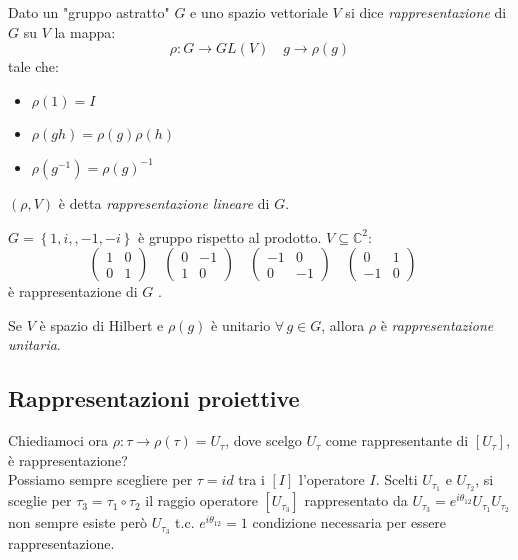 \begin{definition}
    Dato un "gruppo astratto" \(G\) e uno spazio vettoriale \(V\) si dice \textit{rappresentazione} di \(G\) su \(V\) la mappa:
    \begin{equation}
        \rho: G \to GL(V) \quad g \to \rho(g)
    \end{equation}
    tale che:
    \begin{itemize}
        \item \(\rho(1)= I\)
        \item \(\rho(gh)= \rho(g)\rho(h)\)
        \item \(\rho(g^{-1}) = \rho(g)^{-1}\)
    \end{itemize}
    \((\rho, V)\) è detta \textit{rappresentazione lineare } di \(G\).
\end{definition}

\begin{example}
    \(G= \left\{ 1,i,,-1,-i \right\}\) è gruppo rispetto al prodotto. \(V \subseteq \mathbb{C}^2: \)
    \[
        \begin{pmatrix}
            1&0\\0&1
        \end{pmatrix} \quad
        \begin{pmatrix}
            0&-1\\1&0
        \end{pmatrix} \quad
        \begin{pmatrix}
            -1&0\\0&-1
        \end{pmatrix} \quad
        \begin{pmatrix}
            0&1\\-1&0
        \end{pmatrix} \quad
    \]
    è rappresentazione di \(G\) .
\end{example}



Se \(V\) è spazio di Hilbert e \(\rho(g)\) è unitario \(\forall \, g \in G\), allora \(\rho\) è \textit{rappresentazione unitaria}.

\subsection{Rappresentazioni proiettive}

Chiediamoci ora \(\rho: \tau\to \rho(\tau)= U_\tau\), dove scelgo \(U_\tau \) come rappresentante di \(\left[ U_\tau \right]\), è rappresentazione?\\
Possiamo sempre scegliere per \(\tau = id\) tra i \(\left[ I \right] \) l'operatore \(I\). Scelti \(U_{\tau_1}\) e \(U_{\tau_2}\),
si sceglie per \(\tau_3 =\tau_1 \circ \tau_2 \) il raggio operatore \(\left[ U_{\tau_3} \right]\) rappresentato da \(U_{\tau_3}= e^{i\theta_{12}}U_{\tau_1}U_{\tau_2}\)
non sempre esiste però \(U_{\tau_3}\) t.c. \(e^{i\theta_{12}}=1\) condizione necessaria per essere rappresentazione.

